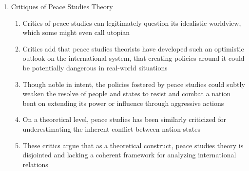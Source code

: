 \documentclass[12pt]{article}
\begin{document}
\begin{enumerate}
\begin{enumerate}
        \end{enumerate}

      \item Critiques of Peace Studies Theory

        \begin{enumerate}

          \item Critics of peace studies can legitimately question its idealistic worldview, which some might even call utopian

          \item Critics add that peace studies theorists have developed such an optimistic outlook on the international system, that creating policies around it could be potentially dangerous in real-world situations

          \item Though noble in intent, the policies fostered by peace studies could subtly weaken the resolve of people and states to resist and combat a nation bent on extending its power or influence through aggressive actions

          \item On a theoretical level, peace studies has been similarly criticized for underestimating the inherent conflict between nation-states

          \item These critics argue that as a theoretical construct, peace studies theory is disjointed and lacking a coherent framework for analyzing international relations

        \end{enumerate}

    \end{enumerate}
\end{document}
